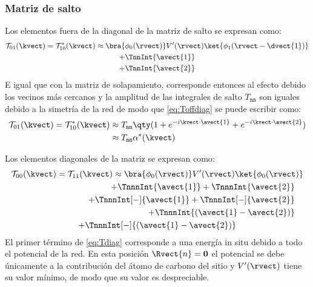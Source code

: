 \subsubsection{Matriz de salto}
Los elementos fuera de la diagonal de la matriz de salto se expresan como:
\begin{multline}\label{eq:Toffdiag}
\mathcal{T}_{01}(\kvect)=\mathcal{T}_{10}^*(\kvect)\approx\bra{\phi_{0}(\rvect)}V^\prime(\rvect)\ket{\phi_{1}(\rvect - \dvect{1})} \\*+ \TnnInt{\avect{1}} \\*+ \TnnInt{\avect{2}}
\end{multline}
E igual que con la matriz de solapamiento, corresponde entonces al efecto debido los 
vecinos más cercanos y la amplitud de las integrales de salto $ T_{\mathtt{nn}} $ 
son iguales debido a la simetría de la red de modo que \eqref{eq:Toffdiag} se puede 
escribir como:
\begin{equation}\label{eq:ToffdiagShort}
\begin{split}
\mathcal{T}_{01}(\kvect)=\mathcal{T}_{10}^*(\kvect)&\approx T_\mathtt{nn} \qty(1 + e^{-i\kvect\cdot\avect{1}} + e^{-i\kvect\cdot\avect{2}}) \\*&\approx T_\mathtt{nn} \alpha^*(\kvect)
\end{split}
\end{equation}

Los elementos diagonales de la matriz se expresan como:
\begin{multline}\label{eq:Tdiag}
\mathcal{T}_{00}(\kvect)=\mathcal{T}_{11}(\kvect) \approx \bra{\phi_{0}(\rvect)}V^\prime(\rvect)\ket{\phi_{0}(\rvect)} \\*
\shoveright{+ \TnnnInt{\avect{1}} + \TnnnInt{\avect{2}}} \\*
\shoveright{+ \TnnnInt[-]{\avect{1}} + \TnnnInt[-]{\avect{2}}} \\*
\shoveright{+ \TnnnInt{(\avect{1} - \avect{2})}} \\*+
\TnnnInt[-]{(\avect{1} - \avect{2})}
\end{multline}
El primer término de \eqref{eq:Tdiag} corresponde a una energía in situ debido a 
todo el potencial de la red. En esta posición $ \Rvect{n} = \mathbf0 $ el potencial 
se debe únicamente a la contribución del átomo de carbono del sitio y $ 
V^\prime(\rvect) $ tiene su valor mínimo, de modo que su valor es despreciable.

